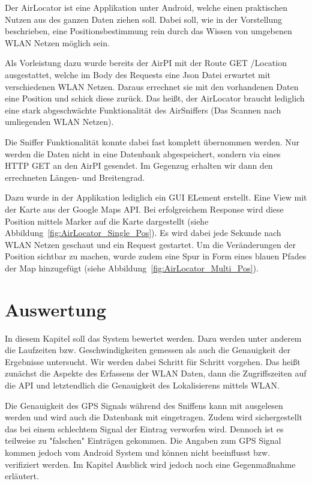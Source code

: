\documentclass[11pt,a4paper]{article}
\begin{document}
Der AirLocator ist eine Applikation unter Android, welche einen praktischen Nutzen aus des ganzen Daten ziehen soll. Dabei soll, wie in der Vorstellung beschrieben, eine Positionsbestimmung rein durch das Wissen von umgebenen WLAN Netzen möglich sein. 

Als Vorleistung dazu wurde bereits der AirPI mit der Route GET /Location ausgestattet, welche im Body des Requests eine Json Datei erwartet mit verschiedenen WLAN Netzen. Daraus errechnet sie mit den vorhandenen Daten eine Position und schick diese zurück. Das heißt, der AirLocator braucht lediglich eine stark abgeschwächte Funktionalität des AirSniffers (Das Scannen nach umliegenden WLAN Netzen).

Die Sniffer Funktionalität konnte dabei fast komplett übernommen werden. Nur werden die Daten nicht in eine Datenbank abgespeichert, sondern via eines HTTP GET an den AirPI gesendet. Im Gegenzug erhalten wir dann den errechneten Längen- und Breitengrad. 

Dazu wurde in der Applikation lediglich ein GUI ELement erstellt. Eine View mit der Karte aus der Google Maps API. Bei erfolgreichem Response wird diese Position mittels Marker auf die Karte dargestellt (siehe Abbildung~\ref{fig:AirLocator_Single_Pos}). Es wird dabei jede Sekunde nach WLAN Netzen geschaut und ein Request gestartet. Um die Veränderungen der Position sichtbar zu machen, wurde zudem eine Spur in Form eines blauen Pfades der Map hinzugefügt (siehe Abbildung~\ref{fig:AirLocator_Multi_Pos}). 

\section{Auswertung}

In diesem Kapitel soll das System bewertet werden. Dazu werden unter anderem die Laufzeiten bzw. Geschwindigkeiten gemessen als auch die Genauigkeit der Ergebnisse untersucht. Wir werden dabei Schritt für Schritt vorgehen. Das heißt zunächst die Aspekte des Erfassens der WLAN Daten, dann die Zugriffszeiten auf die API und letztendlich die Genauigkeit des Lokalisierens mittels WLAN.

Die Genauigkeit des GPS Signals während des Sniffens kann mit ausgelesen werden und wird auch die Datenbank mit eingetragen. Zudem wird sichergestellt das bei einem schlechtem Signal der Eintrag verworfen wird. Dennoch ist es teilweise zu "falschen" Einträgen gekommen. Die Angaben zum GPS Signal kommen jedoch vom Android System und können nicht beeinflusst bzw. verifiziert werden. Im Kapitel Ausblick wird jedoch noch eine Gegenmaßnahme erläutert.
\end{document}
